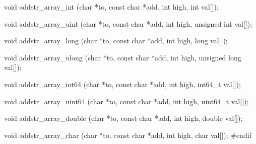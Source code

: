 void  addstr_array_int (char *to, const char *add, int high, int val[]);

void  addstr_array_uint (char *to, const char *add, int high,
                        unsigned int val[]);

void  addstr_array_long (char *to, const char *add, int high, long val[]);

void  addstr_array_ulong (char *to, const char *add, int high,
                         unsigned long val[]);

void  addstr_array_int64 (char *to, const char *add, int high, int64_t val[]);

void  addstr_array_uint64 (char *to, const char *add, int high, uint64_t val[]);

void  addstr_array_double (char *to, const char *add, int high, double val[]);

void  addstr_array_char (char *to, const char *add, int high, char val[]);
\hide
#endif
\endhide\endcode

